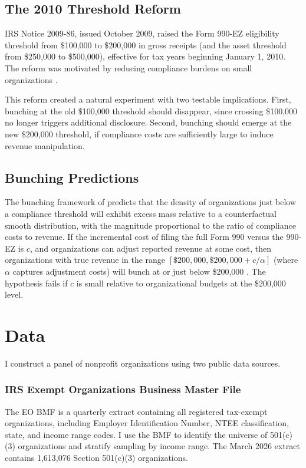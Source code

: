 \documentclass[12pt]{article}
\begin{document}
\subsection{The 2010 Threshold Reform}

IRS Notice 2009-86, issued October 2009, raised the Form 990-EZ eligibility threshold from \$100,000 to \$200,000 in gross receipts (and the asset threshold from \$250,000 to \$500,000), effective for tax years beginning January 1, 2010. The reform was motivated by reducing compliance burdens on small organizations \citep{irs2009notice}.

This reform created a natural experiment with two testable implications. First, bunching at the old \$100,000 threshold should disappear, since crossing \$100,000 no longer triggers additional disclosure. Second, bunching should emerge at the new \$200,000 threshold, if compliance costs are sufficiently large to induce revenue manipulation.

\subsection{Bunching Predictions}

The bunching framework of \citet{kleven2016bunching} predicts that the density of organizations just below a compliance threshold will exhibit excess mass relative to a counterfactual smooth distribution, with the magnitude proportional to the ratio of compliance costs to revenue. If the incremental cost of filing the full Form 990 versus the 990-EZ is $c$, and organizations can adjust reported revenue at some cost, then organizations with true revenue in the range $[\$200{,}000, \$200{,}000 + c/\alpha]$ (where $\alpha$ captures adjustment costs) will bunch at or just below \$200,000 \citep{saez2010earnings, chetty2011adjustment}. The hypothesis fails if $c$ is small relative to organizational budgets at the \$200,000 level.


\section{Data}
\label{sec:data}

I construct a panel of nonprofit organizations using two public data sources.

\subsubsection*{IRS Exempt Organizations Business Master File} The EO BMF is a quarterly extract containing all registered tax-exempt organizations, including Employer Identification Number, NTEE classification, state, and income range codes. I use the BMF to identify the universe of 501(c)(3) organizations and stratify sampling by income range. The March 2026 extract contains 1,613,076 Section 501(c)(3) organizations.
\end{document}
